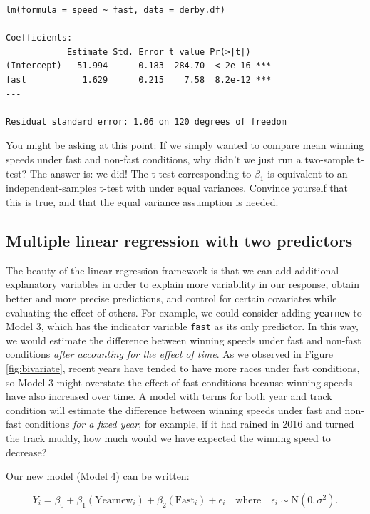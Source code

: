 \documentclass[
]{krantz}
\begin{document}
\begin{verbatim}
lm(formula = speed ~ fast, data = derby.df)

Coefficients:
            Estimate Std. Error t value Pr(>|t|)    
(Intercept)   51.994      0.183  284.70  < 2e-16 ***
fast           1.629      0.215    7.58  8.2e-12 ***
---

Residual standard error: 1.06 on 120 degrees of freedom
\end{verbatim}

You might be asking at this point: If we simply wanted to compare mean winning speeds under fast and non-fast conditions, why didn't we just run a two-sample t-test? The answer is: we did! The t-test corresponding to \(\beta_{1}\) is equivalent to an independent-samples t-test with under equal variances. Convince yourself that this is true, and that the equal variance assumption is needed.

\hypertarget{multiple-linear-regression-with-two-predictors}{%
\subsection{Multiple linear regression with two predictors}\label{multiple-linear-regression-with-two-predictors}}

The beauty of the linear regression framework is that we can add additional explanatory variables in order to explain more variability in our response, obtain better and more precise predictions, and control for certain covariates while evaluating the effect of others. For example, we could consider adding \texttt{yearnew} to Model 3, which has the indicator variable \texttt{fast} as its only predictor. In this way, we would estimate the difference between winning speeds under fast and non-fast conditions \emph{after accounting for the effect of time}. As we observed in Figure \ref{fig:bivariate}, recent years have tended to have more races under fast conditions, so Model 3 might overstate the effect of fast conditions because winning speeds have also increased over time. A model with terms for both year and track condition will estimate the difference between winning speeds under fast and non-fast conditions \emph{for a fixed year}; for example, if it had rained in 2016 and turned the track muddy, how much would we have expected the winning speed to decrease?

Our new model (Model 4) can be written:

\begin{equation}
Y_{i}=\beta_{0}+\beta_{1}(\textrm{Yearnew}_{i})+\beta_{2}(\textrm{Fast}_{i})+\epsilon_{i}\quad \textrm{where}\quad \epsilon_{i}\sim \textrm{N}(0,\sigma^2).
\label{eq:model4}
\end{equation}
\end{document}
